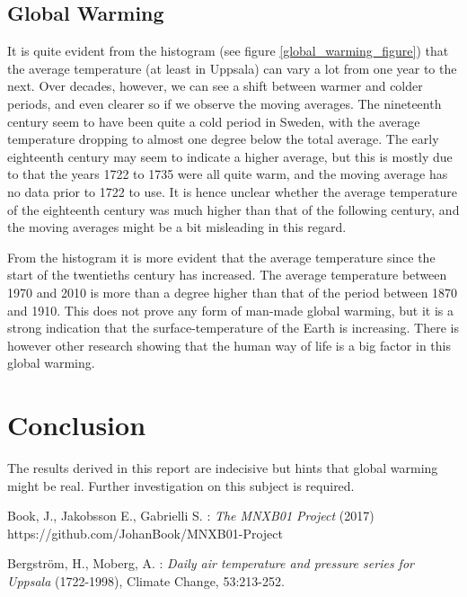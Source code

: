 \documentclass[a4paper]{article}
\begin{document}
\subsection{Global Warming}

It is quite evident from the histogram (see figure \ref{global_warming_figure}) that the average temperature (at least in Uppsala) can vary a lot from one year to the next. Over decades, however, we can see a shift between warmer and colder periods, and even clearer so if we observe the moving averages. The nineteenth century seem to have been quite a cold period in Sweden, with the average temperature dropping to almost one degree below the total average. The early eighteenth century may seem to indicate a higher average, but this is mostly due to that the years 1722 to 1735 were all quite warm, and the moving average has no data prior to 1722 to use. It is hence unclear whether the average temperature of the eighteenth century was much higher than that of the following century, and the moving averages might be a bit misleading in this regard.

From the histogram it is more evident that the average temperature since the start of the twentieths century has increased. The average temperature between 1970 and 2010 is more than a degree higher than that of the period between 1870 and 1910. This does not prove any form of man-made global warming, but it is a strong indication that the surface-temperature of the Earth is increasing. There is however other research showing that the human way of life is a big factor in this global warming.

\section{Conclusion}
The results derived in this report are indecisive but hints that global warming might be real. Further investigation on this subject is required.

\begin{thebibliography}{9}
Book, J., Jakobsson E., Gabrielli S. : 
\textit{The MNXB01 Project} (2017)\\
https://github.com/JohanBook/MNXB01-Project

Bergström, H., Moberg, A. :
    \textit{Daily air temperature and pressure series for Uppsala} (1722-1998), 
    Climate Change, 53:213-252.

\end{thebibliography}
\end{document}
